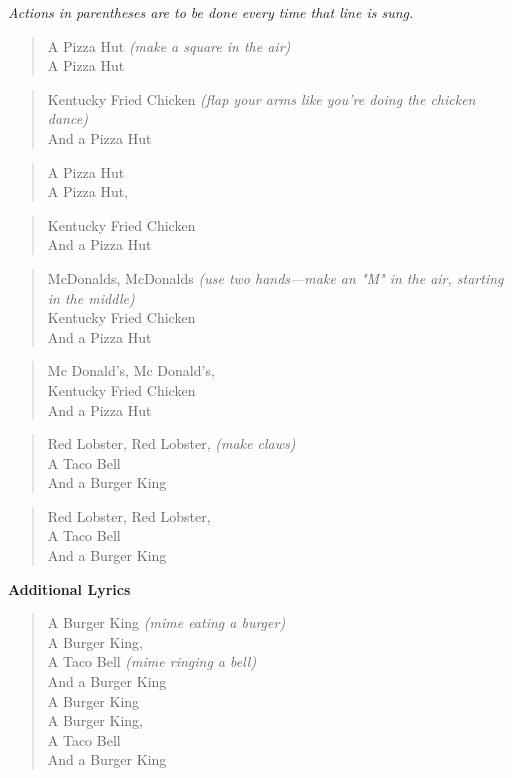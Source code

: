 
\textit{Actions in parentheses are to be done every time that line is sung.}

\begin{verse}
A Pizza Hut \textit{(make a square in the air)} \\
A Pizza Hut \\
\end{verse}

\begin{verse}
Kentucky Fried Chicken \textit{(flap your arms like you're doing the chicken dance)} \\
And a Pizza Hut \\
\end{verse}

\begin{verse}
A Pizza Hut \\
A Pizza Hut, \\
\end{verse}

\begin{verse}
Kentucky Fried Chicken \\
And a Pizza Hut \\
\end{verse}

\begin{verse}
McDonalds, McDonalds \textit{(use two hands---make an "M" in the air, starting in the middle)} \\
Kentucky Fried Chicken \\
And a Pizza Hut \\
\end{verse}

\begin{verse}
Mc Donald's, Mc Donald's, \\
Kentucky Fried Chicken \\
And a Pizza Hut \\
\end{verse}

\begin{verse}
Red Lobster, Red Lobster, \textit{(make claws)} \\
A Taco Bell \\
And a Burger King \\
\end{verse}

\begin{verse}
Red Lobster, Red Lobster, \\
A Taco Bell \\
And a Burger King \\
\end{verse}

\textbf{Additional Lyrics}

\begin{verse}
A Burger King \textit{(mime eating a burger)} \\
A Burger King, \\
A Taco Bell \textit{(mime ringing a bell)} \\
And a Burger King \\
A Burger King \\
A Burger King, \\
A Taco Bell \\
And a Burger King \\
\end{verse}
